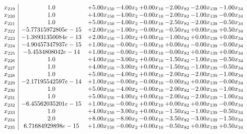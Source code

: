 \documentclass[8pt]{article}
\begin{document}
\[\begin{array}{c| c c@{\hskip 2pt} c@{\hskip 2pt} c@{\hskip 2pt} c@{\hskip 2pt} c@{\hskip 2pt} c@{\hskip 2pt} }
 x_{219}   &  1.0 & +  5.00 x_{150} & -4.00 x_{2} & +  0.00 x_{10} & -2.00 x_{82} & -2.00 x_{139} & -1.00 x_{34}\\
 x_{220}   &  1.0 & +  4.00 x_{150} & -4.00 x_{2} & -0.00 x_{10} & -2.00 x_{82} & -1.00 x_{139} & -0.00 x_{34}\\
 x_{221}   &  1.0 & +  5.00 x_{150} & -4.00 x_{2} & -0.00 x_{10} & -2.50 x_{82} & -2.00 x_{139} & -0.50 x_{34}\\
 x_{222}   &  -5.77315972805e-15 & +  2.00 x_{150} & -1.00 x_{2} & -0.00 x_{10} & -0.50 x_{82} & +  0.00 x_{139} & +  0.50 x_{34}\\
 x_{223}   &  -1.38931350084e-13 & +  2.00 x_{150} & -1.00 x_{2} & +  0.00 x_{10} & -1.00 x_{82} & +  0.00 x_{139} & +  0.00 x_{34}\\
 x_{224}   &  -4.90457347937e-15 & +  1.00 x_{150} & -0.00 x_{2} & -0.00 x_{10} & +  0.00 x_{82} & -0.00 x_{139} & -0.00 x_{34}\\
 x_{225}   &  -5.4534808042e-14 & +  1.00 x_{150} & -0.00 x_{2} & -0.00 x_{10} & -0.00 x_{82} & +  0.00 x_{139} & +  0.00 x_{34}\\
 x_{226}   &  1.0 & +  4.00 x_{150} & -3.00 x_{2} & +  0.00 x_{10} & -1.50 x_{82} & -1.00 x_{139} & -0.50 x_{34}\\
 x_{227}   &  1.0 & +  4.00 x_{150} & -3.00 x_{2} & +  0.00 x_{10} & -1.50 x_{82} & -1.00 x_{139} & -0.50 x_{34}\\
 x_{228}   &  1.0 & +  5.00 x_{150} & -4.00 x_{2} & +  0.00 x_{10} & -2.00 x_{82} & -2.00 x_{139} & -1.00 x_{34}\\
 x_{229}   &  -2.17195542597e-14 & +  1.00 x_{150} & -0.00 x_{2} & -0.00 x_{10} & -0.00 x_{82} & +  0.00 x_{139} & -0.00 x_{34}\\
 x_{230}   &  1.0 & +  5.00 x_{150} & -4.00 x_{2} & -0.00 x_{10} & -2.00 x_{82} & -2.00 x_{139} & -1.00 x_{34}\\
 x_{231}   &  1.0 & +  5.00 x_{150} & -4.00 x_{2} & +  0.00 x_{10} & -2.00 x_{82} & -2.00 x_{139} & -1.00 x_{34}\\
 x_{232}   &  -6.45562035201e-15 & +  1.00 x_{150} & -0.00 x_{2} & +  0.00 x_{10} & +  0.00 x_{82} & +  0.00 x_{139} & -0.00 x_{34}\\
 x_{233}   &  1.0 & +  4.00 x_{150} & -3.00 x_{2} & +  0.00 x_{10} & -1.50 x_{82} & -1.00 x_{139} & -0.50 x_{34}\\
 x_{234}   &  2.0 & +  8.00 x_{150} & -8.00 x_{2} & -0.00 x_{10} & -3.50 x_{82} & -3.00 x_{139} & -1.50 x_{34}\\
 x_{235}   &  6.71684929898e-15 & +  1.00 x_{150} & -0.00 x_{2} & +  0.00 x_{10} & -0.50 x_{82} & +  0.00 x_{139} & +  0.50 x_{34}\\

\end{array}\]
\end{document}
